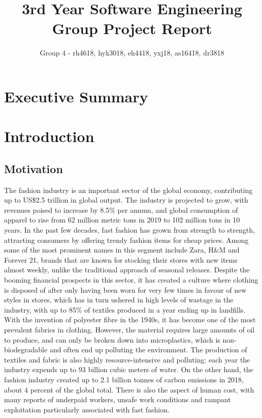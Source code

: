 \documentclass[a4paper, 11pt]{article}
\title{3rd Year Software Engineering Group Project Report}
\author{Group 4 - rh4618, hyk3018, eh4418, yxj18, as16418, dr3818}
\begin{document}
  \maketitle

  \section{Executive Summary}

  \section{Introduction}
    \subsection{Motivation}
      The fashion industry is an important sector of the global economy, contributing up to US\$2.5 trillion in global output.\cite{jec-economic-fashion} The industry is projected to grow, with revenues poised to increase by 8.5\% per annum, and global consumption of apparel to rise from 62 million metric tons in 2019 to 102 million tons in 10 years.\cite{world-bank-enviro} In the past few decades, fast fashion has grown from strength to strength, attracting consumers by offering trendy fashion items for cheap prices. Among some of the most prominent names in this segment include Zara, H\&M and Forever 21, brands that are known for stocking their stores with new items almost weekly, unlike the traditional approach of seasonal releases. \cite{investopedia-fashion} 
      \newline\newline
      Despite the booming financial prospects in this sector, it has created a culture where clothing is disposed of after only having been worn for very few times in favour of new styles in stores, which has in turn ushered in high levels of wastage in the industry, with up to 85\% of textiles produced in a year ending up in landfills. With the invention of polyester fibre in the 1940s, it has become one of the most prevalent fabrics in clothing.\cite{weforum-fashion} However, the material requires large amounts of oil to produce, and can only be broken down into microplastics, which is non-biodegradable and often end up polluting the environment. The production of textiles and fabric is also highly resource-intensive and polluting: each year the industry expends up to 93 billion cubic meters of water.\cite{world-bank-enviro} On the other hand, the fashion industry created up to 2.1 billion tonnes of carbon emissions in 2018, about 4 percent of the global total.\cite{mckinsey-fashion} There is also the aspect of human cost, with many reports of underpaid workers, unsafe work conditions and rampant exploitation particularly associated with fast fashion.\cite{forbes-sweatshops} 
\end{document}
